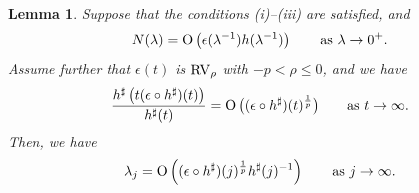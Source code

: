 \documentclass[10pt, a4paper]{amsart}
\newcommand{\op}{\operatorname}
\numberwithin{equation}{section}
\newtheorem{lemma}[theorem]{Lemma}
\theoremstyle{definition}
\theoremstyle{remark}
\newcommand{\RV}{\textup{RV}}
\begin{document}
\begin{lemma}\label{lem:app.Ntolambda2}
 Suppose that the conditions (i)--(iii) are satisfied, and 
  \begin{equation*}
  N(\lambda)= \op{O}\left(\epsilon(\lambda^{-1}) h(\lambda^{-1})\right)  \qquad \textup{as}\ \lambda \rightarrow 0^+.
\end{equation*}
Assume further that $\epsilon(t)$ is $\RV_\rho$ with $-p<\rho\leq 0$, and we have
\begin{equation}\label{eq:app.sharp-Potter}
 \frac{h^\sharp\left(t(\epsilon\circ h^\sharp)(t)\right)}{h^\sharp(t)}=\op{O}\big( (\epsilon\circ h^\sharp) (t)^{\frac{1}{p}}\big)\qquad \textup{as}\ t\rightarrow \infty.
\end{equation}
Then, we have
 \begin{equation*}
 \lambda_j = \op{O}\left((\epsilon \circ h^\sharp)(j)^{\frac1p}h^\sharp(j)^{-1}\right) \qquad \textup{as}\ j\rightarrow \infty.
\end{equation*}
\end{lemma}
\end{document}
